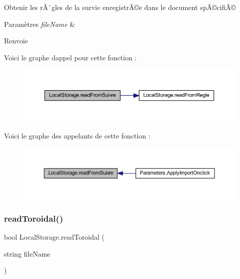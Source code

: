 Obtenir les rÃ¨gles de la survie enregistrÃ©e dans le document spÃ©cifiÃ© 


\begin{DoxyParams}{Paramètres}
{\em file\+Name} & \\
\hline
\end{DoxyParams}
\begin{DoxyReturn}{Renvoie}

\end{DoxyReturn}
Voici le graphe d\textquotesingle{}appel pour cette fonction \+:\nopagebreak
\begin{figure}[H]
\begin{center}
\leavevmode
\includegraphics[width=350pt]{class_local_storage_a0c0003569be45cff5fda794e42243c1e_cgraph}
\end{center}
\end{figure}
Voici le graphe des appelants de cette fonction \+:\nopagebreak
\begin{figure}[H]
\begin{center}
\leavevmode
\includegraphics[width=350pt]{class_local_storage_a0c0003569be45cff5fda794e42243c1e_icgraph}
\end{center}
\end{figure}
\mbox{\label{class_local_storage_a9197311a356432fa7a9480c69f42dd9c}} 
\subsubsection{\texorpdfstring{read\+Toroidal()}{readToroidal()}}
{\footnotesize\ttfamily bool Local\+Storage.\+read\+Toroidal (\begin{DoxyParamCaption}\item[{string}]{file\+Name }\end{DoxyParamCaption})\hspace{0.3cm}{\ttfamily [inline]}}

